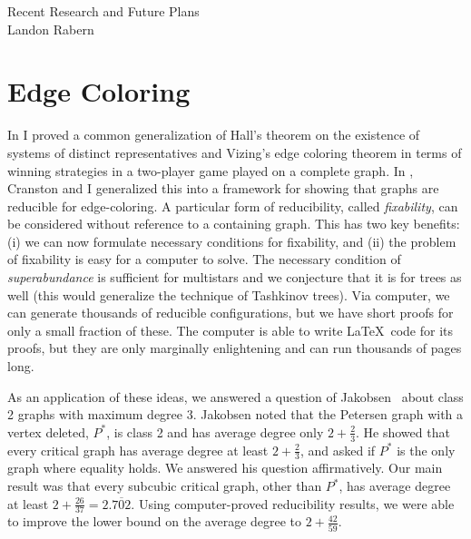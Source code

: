\documentclass[12pt]{article}
\theoremstyle{plain}
\theoremstyle{definition}
\theoremstyle{remark}
\begin{document}

\begin{center}
{\Large \sc Recent Research and Future Plans}\\
{\sc Landon Rabern}
\end{center}

\vspace{.3in}

\section{Edge Coloring}
In \cite{rabern2012game} I proved a common generalization of Hall's theorem on the existence of systems of distinct representatives and Vizing's edge coloring theorem in terms of winning strategies in a two-player game played on a complete graph. In \cite{cranston2015edge}, Cranston and I generalized this into a framework for showing that graphs are reducible for edge-coloring.  A particular form of reducibility, called \emph{fixability}, can be considered without reference to a containing graph.  This has two key benefits: (i) we can now formulate necessary conditions for fixability, and (ii) the problem of fixability is easy for a computer to solve. The necessary condition of \emph{superabundance} is sufficient for multistars and we conjecture that it is for trees as well (this would generalize the technique of Tashkinov trees). Via computer, we can generate thousands of reducible configurations, but we have short proofs for only a small fraction of these.  The computer is able to write \LaTeX\ code for its proofs, but they are only marginally enlightening and can run thousands of pages long. 

As an application of these ideas, we \cite{cranston2015subcubic} answered a question of Jakobsen~\cite{Jakobsen73} about class 2 graphs with maximum degree $3$.  Jakobsen noted that the
Petersen graph with a vertex deleted, $P^*$, is class 2 and has average degree only $2+\frac23$.  He showed
that every critical graph has average degree at least $2+\frac23$, and asked if
$P^*$ is the only graph where equality holds.  We answered his
question affirmatively.  Our main result was that every subcubic critical graph, other than $P^*$, has average degree at least $2+\frac{26}{37}=2.\overline{702}$.  Using computer-proved reducibility results, we were able to improve the lower bound on the average degree to $2+\frac{42}{59}$. 
\end{document}
